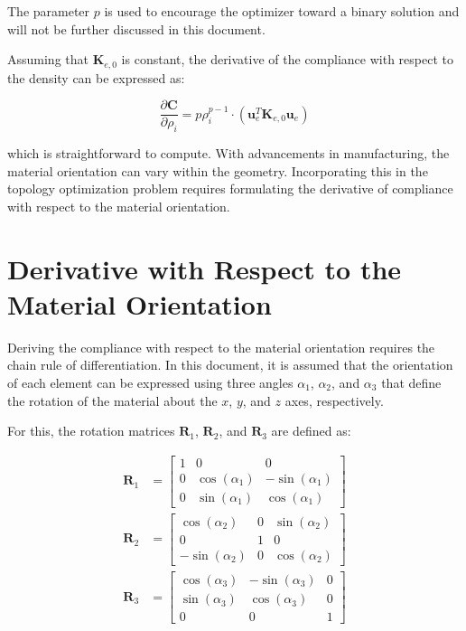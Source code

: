 The parameter \(p\) is used to encourage the optimizer toward a binary solution and will not be further discussed in this document.

Assuming that \(\mathbf{K}_{e,0}\) is constant, the derivative of the compliance with respect to the density can be expressed as:

\begin{equation}
\label{eq:compliance_derivative}
\frac{\partial \mathbf{C}}{\partial \rho_i} = p \rho_i^{p - 1} \cdot \left( \mathbf{u}_e^T \mathbf{K}_{e,0} \mathbf{u}_e \right)
\end{equation}

which is straightforward to compute. With advancements in manufacturing, the material orientation can vary within the geometry.
Incorporating this in the topology optimization problem requires formulating the derivative of compliance with respect to the material orientation.

\section{Derivative with Respect to the Material Orientation}

Deriving the compliance with respect to the material orientation requires the chain rule of differentiation.
In this document, it is assumed that the orientation of each element can be expressed using three angles \(\alpha_{1}\), \(\alpha_{2}\), and \(\alpha_{3}\)
that define the rotation of the material about the \(x\), \(y\), and \(z\) axes, respectively.

For this, the rotation matrices \(\mathbf{R}_1\), \(\mathbf{R}_2\), and \(\mathbf{R}_3\) are defined as:

\begin{align}
\mathbf{R}_1 &= \begin{bmatrix}
1 & 0 & 0 \\
0 & \cos(\alpha_{1}) & -\sin(\alpha_{1}) \\
0 & \sin(\alpha_{1}) & \cos(\alpha_{1})
\end{bmatrix} \\
\mathbf{R}_2 &= \begin{bmatrix}
\cos(\alpha_{2}) & 0 & \sin(\alpha_{2}) \\
0 & 1 & 0 \\
-\sin(\alpha_{2}) & 0 & \cos(\alpha_{2})
\end{bmatrix} \\
\mathbf{R}_3 &= \begin{bmatrix}
\cos(\alpha_{3}) & -\sin(\alpha_{3}) & 0 \\
\sin(\alpha_{3}) & \cos(\alpha_{3}) & 0 \\
0 & 0 & 1
\end{bmatrix}
\end{align}

